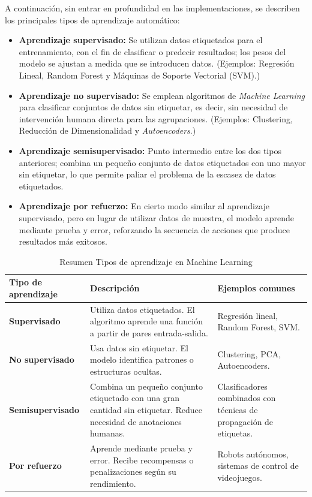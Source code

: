 A continuación, sin entrar en profundidad en las implementaciones, se describen los principales tipos de aprendizaje automático:

\begin{itemize}
    \item \textbf{Aprendizaje supervisado:} Se utilizan datos etiquetados para el entrenamiento, con el fin de clasificar o predecir resultados; los pesos del modelo se ajustan a medida que se introducen datos. (Ejemplos: Regresión Lineal, Random Forest y Máquinas de Soporte Vectorial (SVM).)
    \item \textbf{Aprendizaje no supervisado:} Se emplean algoritmos de \textit{Machine Learning} para clasificar conjuntos de datos sin etiquetar, es decir, sin necesidad de intervención humana directa para las agrupaciones. (Ejemplos: Clustering, Reducción de Dimensionalidad y \textit{Autoencoders}.)
    \item \textbf{Aprendizaje semisupervisado:} Punto intermedio entre los dos tipos anteriores; combina un pequeño conjunto de datos etiquetados con uno mayor sin etiquetar, lo que permite paliar el problema de la escasez de datos etiquetados.
    \item \textbf{Aprendizaje por refuerzo:} En cierto modo similar al aprendizaje supervisado, pero en lugar de utilizar datos de muestra, el modelo aprende mediante prueba y error, reforzando la secuencia de acciones que produce resultados más exitosos.
\end{itemize}

\vspace{0.5cm}
\begin{table}[H]
\centering
\caption{Resumen Tipos de aprendizaje en Machine Learning}
\begin{tabular}{|p{3.5cm}|p{6cm}|p{4.5cm}|}
\hline
\textbf{Tipo de aprendizaje} & \textbf{Descripción} & \textbf{Ejemplos comunes} \\
\hline
\textbf{Supervisado} & Utiliza datos etiquetados. El algoritmo aprende una función a partir de pares entrada-salida. & Regresión lineal, Random Forest, SVM. \\
\hline
\textbf{No supervisado} & Usa datos sin etiquetar. El modelo identifica patrones o estructuras ocultas. & Clustering, PCA, Autoencoders. \\
\hline
\textbf{Semisupervisado} & Combina un pequeño conjunto etiquetado con una gran cantidad sin etiquetar. Reduce necesidad de anotaciones humanas. & Clasificadores combinados con técnicas de propagación de etiquetas. \\
\hline
\textbf{Por refuerzo} & Aprende mediante prueba y error. Recibe recompensas o penalizaciones según su rendimiento. & Robots autónomos, sistemas de control de videojuegos. \\
\hline
\end{tabular}
\label{tab:tipos_aprendizaje}
\end{table}


